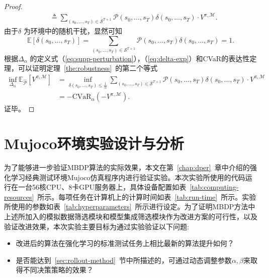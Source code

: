 \begin{proof}
\begin{equation}
\begin{aligned}
    &\triangleq \sum_{(s_0,\ldots,s_T)\in\mathcal{S}^{T+1}}\mathcal{P}(s_0,\ldots,s_T)\delta(s_0,\ldots,s_T)\cdot V^{\pi,\mathcal{M}}.
\end{aligned}
\end{equation}
由于$\delta$ 为环境中的随机干扰，显然可知
\begin{equation}\label{eq:delta-exp}
    \mathbb{E}\left[\delta(s_0,\ldots,s_T)\right] = \sum_{(s_0,\ldots,s_T)\in\mathcal{S}^{T+1}}\mathcal{P}(s_0,\ldots,s_T)\delta(s_0,\ldots,s_T) = 1.
\end{equation}
根据$\Delta_\alpha$ 的定义式（\ref{eq:supp-perturbation}），（\ref{eq:delta-exp}）和CVaR的表达性定理\cite{chow2015risk}，可以证明定理~\ref{the:robustness}~的第二个等式
\begin{equation}
\begin{aligned}
    \inf\limits_{\Delta_\alpha}\mathbb{E}_{\hat{\mathcal{P}}}[V^{\pi,\mathcal{M}}] &= \inf\limits_{\delta(s_0,\ldots,s_T)\leq\frac{1}{\alpha}}\sum_{(s_0,\ldots,s_T)\in\mathcal{S}^{T+1}}\mathcal{P}(s_0,\ldots,s_T)\delta(s_0,\ldots,s_T)\cdot V^{\pi,\mathcal{M}}\\
    &=-\mathrm{CVaR}_\alpha(-V^{\pi,\mathcal{M}}).
\end{aligned}
\label{proof:cvar-eq}
\end{equation}
证毕。
\end{proof}

\section{Mujoco环境实验设计与分析}

为了能够进一步验证MBDP算法的实际效果，本文在第~\ref{chap:dper}~章中介绍的强化学习经典测试环境Mujoco仿真程序内进行验证实验。本次实验所使用的代码运行在一台56核CPU、8卡GPU服务器上，具体设备配置如表~\ref{tab:computing-resources}~所示。每项任务在计算机上的计算时间如表~\ref{tab:run-time}~所示。实验所使用的参数如表~\ref{tab:hyperparameters}~所示进行设定。为了证明MBDP方法中上述所加入的模拟数据筛选模块和模型集成筛选模块作为改进方案的可行性，以及验证改进效果，本次实验主要目标为通过实验验证以下问题:

\begin{itemize}
    \item 改进后的算法在强化学习的标准测试任务上相比最新的算法提升如何？
    \item 是否能达到~\ref{sec:rollout-method}~节中所描述的，可通过动态调整参数$\alpha,\beta$来取得不同决策策略的效果？
\end{itemize}

